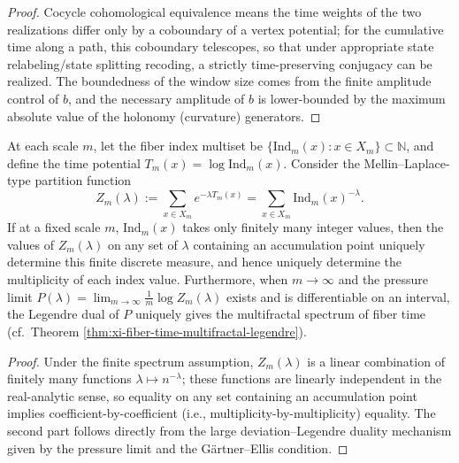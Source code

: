 \begin{proof}
Cocycle cohomological equivalence means the time weights of the two realizations differ only by a coboundary of a vertex potential; for the cumulative time along a path, this coboundary telescopes, so that under appropriate state relabeling/state splitting recoding, a strictly time-preserving conjugacy can be realized.
The boundedness of the window size comes from the finite amplitude control of \(b\), and the necessary amplitude of \(b\) is lower-bounded by the maximum absolute value of the holonomy (curvature) generators.
\end{proof}

\begin{proposition}\label{prop:xi-time-partition-identifiability-ind-multiset}
At each scale \(m\), let the fiber index multiset be \(\{\mathrm{Ind}_m(x):x\in X_m\}\subset\mathbb N\), and define the time potential \(T_m(x)=\log \mathrm{Ind}_m(x)\).
Consider the Mellin--Laplace-type partition function
\[
Z_m(\lambda):=\sum_{x\in X_m} e^{-\lambda T_m(x)}=\sum_{x\in X_m}\mathrm{Ind}_m(x)^{-\lambda}.
\]
If at a fixed scale \(m\), \(\mathrm{Ind}_m(x)\) takes only finitely many integer values, then the values of \(Z_m(\lambda)\) on any set of \(\lambda\) containing an accumulation point uniquely determine this finite discrete measure, and hence uniquely determine the multiplicity of each index value.
Furthermore, when \(m\to\infty\) and the pressure limit
\(
P(\lambda)=\lim_{m\to\infty}\frac{1}{m}\log Z_m(\lambda)
\)
exists and is differentiable on an interval, the Legendre dual of \(P\) uniquely gives the multifractal spectrum of fiber time (cf.\ Theorem \ref{thm:xi-fiber-time-multifractal-legendre}).
\end{proposition}

\begin{proof}
Under the finite spectrum assumption, \(Z_m(\lambda)\) is a linear combination of finitely many functions \(\lambda\mapsto n^{-\lambda}\); these functions are linearly independent in the real-analytic sense, so equality on any set containing an accumulation point implies coefficient-by-coefficient (i.e., multiplicity-by-multiplicity) equality.
The second part follows directly from the large deviation--Legendre duality mechanism given by the pressure limit and the G\"artner--Ellis condition.
\end{proof}
